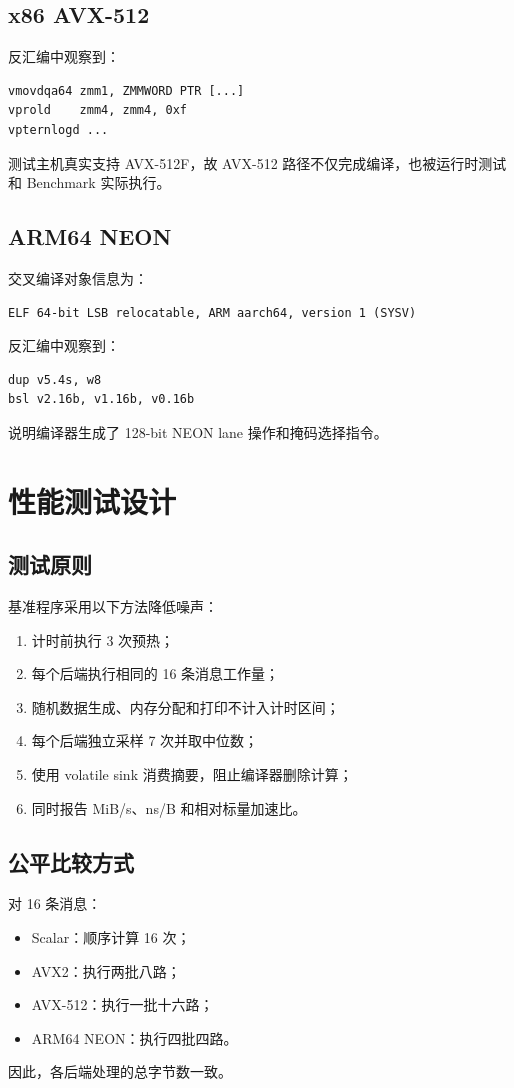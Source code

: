 \documentclass[UTF8,a4paper,12pt]{ctexart}
\begin{document}
\subsection{x86 AVX-512}
反汇编中观察到：
\begin{verbatim}
vmovdqa64 zmm1, ZMMWORD PTR [...]
vprold    zmm4, zmm4, 0xf
vpternlogd ...
\end{verbatim}
测试主机真实支持 AVX-512F，故 AVX-512 路径不仅完成编译，也被运行时测试和 Benchmark 实际执行。

\subsection{ARM64 NEON}
交叉编译对象信息为：
\begin{verbatim}
ELF 64-bit LSB relocatable, ARM aarch64, version 1 (SYSV)
\end{verbatim}
反汇编中观察到：
\begin{verbatim}
dup v5.4s, w8
bsl v2.16b, v1.16b, v0.16b
\end{verbatim}
说明编译器生成了 128-bit NEON lane 操作和掩码选择指令。

\section{性能测试设计}

\subsection{测试原则}
基准程序采用以下方法降低噪声：
\begin{enumerate}
  \item 计时前执行 3 次预热；
  \item 每个后端执行相同的 16 条消息工作量；
  \item 随机数据生成、内存分配和打印不计入计时区间；
  \item 每个后端独立采样 7 次并取中位数；
  \item 使用 volatile sink 消费摘要，阻止编译器删除计算；
  \item 同时报告 MiB/s、ns/B 和相对标量加速比。
\end{enumerate}

\subsection{公平比较方式}
对 16 条消息：
\begin{itemize}
  \item Scalar：顺序计算 16 次；
  \item AVX2：执行两批八路；
  \item AVX-512：执行一批十六路；
  \item ARM64 NEON：执行四批四路。
\end{itemize}
因此，各后端处理的总字节数一致。
\end{document}
